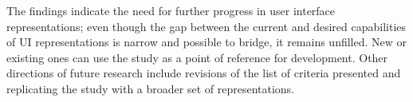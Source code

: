 The findings indicate the need for further progress in user interface representations;
even though the gap between the current and desired capabilities of UI representations is narrow and possible to bridge, it remains unfilled.
New or existing ones can use the study as a point of reference for development.
Other directions of future research include revisions of the list of criteria presented and replicating the study with a broader set of representations.
